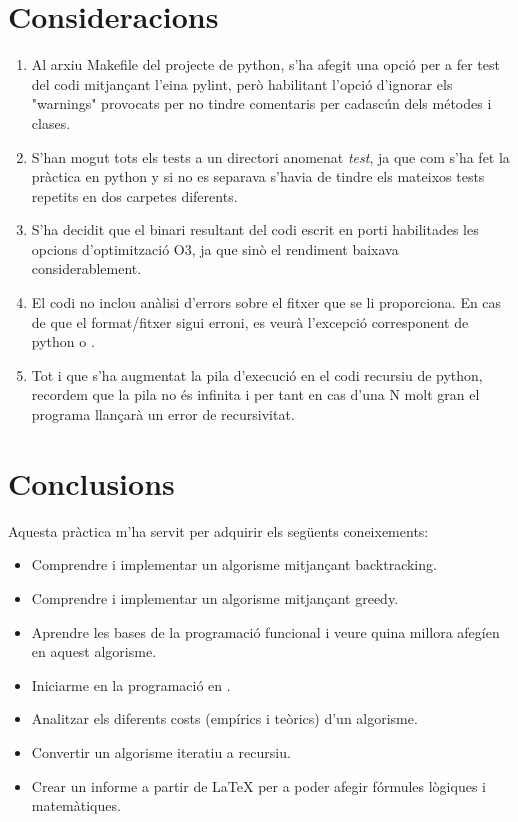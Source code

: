 \documentclass[12pt, letterpaper]{article}
\begin{document}
\section{Consideracions}
\begin{enumerate}
\item Al arxiu Makefile del projecte de python, s'ha afegit una opció per a fer test del codi mitjançant l'eina pylint, però habilitant l'opció d'ignorar els "warnings" provocats per no tindre
    comentaris per cadascún dels métodes i clases.
\item S'han mogut tots els tests a un directori anomenat \textit{test}, ja que com s'ha fet la pràctica en python y \cpluspluslogo  si no es separava s'havia de tindre els mateixos tests repetits en dos carpetes diferents.
\item S'ha decidit que el binari resultant del codi escrit en \cpluspluslogo porti habilitades les opcions d'optimització O3, ja que sinò el rendiment baixava considerablement.
\item El codi no inclou anàlisi d'errors sobre el fitxer que se li proporciona. En cas de que el format/fitxer sigui erroni, es veurà l'excepció corresponent 
    de python o \cpluspluslogo.
\item Tot i que s'ha augmentat la pila d'execució en el codi recursiu de python, recordem que la pila no és infinita i per tant en cas d'una N molt gran el programa llançarà un error de recursivitat.
\end{enumerate}

\section{Conclusions}
Aquesta pràctica m'ha servit per adquirir els següents coneixements:
\begin{itemize}
    \item Comprendre i implementar un algorisme mitjançant backtracking.
    \item Comprendre i implementar un algorisme mitjançant greedy.
    \item Aprendre les bases de la programació funcional i veure quina millora afegíen en aquest algorisme.
    \item Iniciarme en la programació en \cpluspluslogo.
    \item Analitzar els diferents costs (empírics i teòrics) d'un algorisme.
    \item Convertir un algorisme iteratiu a recursiu.
    \item Crear un informe a partir de {\LaTeX} per a poder afegir fórmules lògiques i matemàtiques.
\end{itemize}
\end{document}
